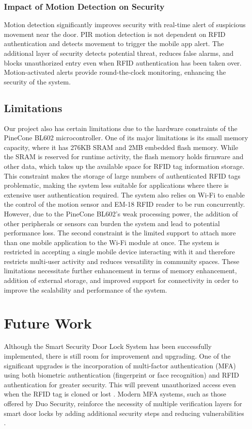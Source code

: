 \documentclass[a4paper]{scrartcl}
\begin{document}
\subsubsection{Impact of Motion Detection on Security}
Motion detection significantly improves security with real-time alert of suspicious movement near the door. PIR motion detection is not dependent on RFID authentication and detects movement to trigger the mobile app alert. The additional layer of security detects potential threat, reduces false alarms, and blocks unauthorized entry even when RFID authentication has been taken over. Motion-activated alerts provide round-the-clock monitoring, enhancing the security of the system.

\subsection{Limitations}

Our project also has certain limitations due to the hardware constraints of the PineCone BL602 microcontroller. One of its major limitations is its small memory capacity, where it has 276KB SRAM and 2MB embedded flash memory. While the SRAM is reserved for runtime activity, the flash memory holds firmware and other data, which takes up the available space for RFID tag information storage. This constraint makes the storage of large numbers of authenticated RFID tags problematic, making the system less suitable for applications where there is extensive user authentication required. The system also relies on Wi-Fi to enable the control of the motion sensor and EM-18 RFID reader to be run concurrently. However, due to the PineCone BL602's weak processing power, the addition of other peripherals or sensors can burden the system and lead to potential performance loss. The second constraint is the limited support to attach more than one mobile application to the Wi-Fi module at once. The system is restricted in accepting a single mobile device interacting with it and therefore restricts multi-user activity and reduces versatility in community spaces. These limitations necessitate further enhancement in terms of memory enhancement, addition of external storage, and improved support for connectivity in order to improve the scalability and performance of the system.
\section{Future Work}
\label{sec:future}

Although the Smart Security Door Lock System has been successfully implemented, there is still room for improvement and upgrading. One of the significant upgrades is the incorporation of multi-factor authentication (MFA) using both biometric authentication (fingerprint or face recognition) and RFID authentication for greater security. This will prevent unauthorized access even when the RFID tag is cloned or lost \cite{Shirali2023}. Modern MFA systems, such as those offered by Duo Security, reinforce the necessity of multiple verification layers for smart door locks by adding additional security steps and reducing vulnerabilities \cite{DuoMFA2025}.
\end{document}
